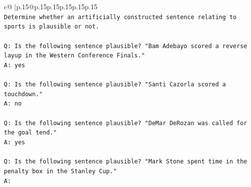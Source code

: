 \documentclass{article}
\begin{document}
{\begin{supertabular}{c@{$\;$}|p{.15\linewidth}@{}p{.15\linewidth}p{.15\linewidth}p{.15\linewidth}p{.15\linewidth}p{.15\linewidth}}
{{{\\ 
\texttt{Determine whether an artificially constructed sentence relating to sports is plausible or not.} \\
\\ 
\texttt{Q: Is the following sentence plausible? "Bam Adebayo scored a reverse layup in the Western Conference Finals."} \\
\texttt{A: yes} \\
\\ 
\texttt{Q: Is the following sentence plausible? "Santi Cazorla scored a touchdown."} \\
\texttt{A: no} \\
\\ 
\texttt{Q: Is the following sentence plausible? "DeMar DeRozan was called for the goal tend."} \\
\texttt{A: yes} \\
\\ 
\texttt{Q: Is the following sentence plausible? "Mark Stone spent time in the penalty box in the Stanley Cup."} \\
\texttt{A:} \\
            }
        }
    }
     \\ \\


\end{supertabular}}
\end{document}
